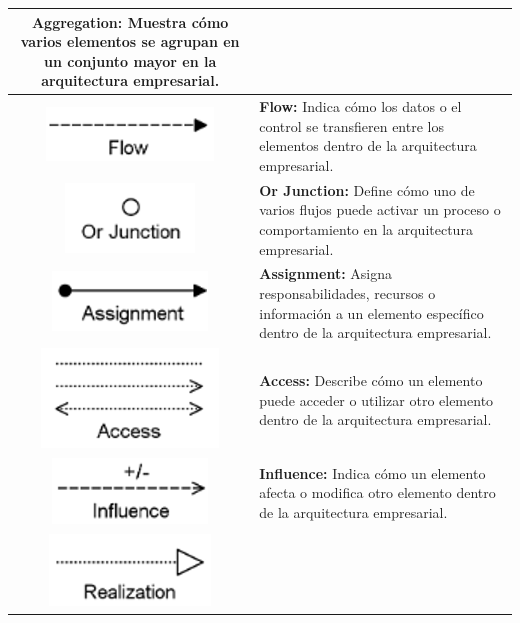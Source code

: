 \begin{longtable}{|c|p{8cm}|}
\textbf{Aggregation:} Muestra cómo varios elementos se agrupan en un conjunto mayor en la arquitectura empresarial. \\
\hline
\includegraphics{anexos/ARCHI/relations/flow.png} & 
\textbf{Flow:} Indica cómo los datos o el control se transfieren entre los elementos dentro de la arquitectura empresarial. \\
\hline
\includegraphics{anexos/ARCHI/relations/or.png} & 
\textbf{Or Junction:} Define cómo uno de varios flujos puede activar un proceso o comportamiento en la arquitectura empresarial. \\
\hline
\includegraphics{anexos/ARCHI/relations/assignment.png} & 
\textbf{Assignment:} Asigna responsabilidades, recursos o información a un elemento específico dentro de la arquitectura empresarial. \\
\hline
\includegraphics{anexos/ARCHI/relations/access.png} & 
\textbf{Access:} Describe cómo un elemento puede acceder o utilizar otro elemento dentro de la arquitectura empresarial. \\
\hline
\includegraphics{anexos/ARCHI/relations/influence.png} & 
\textbf{Influence:} Indica cómo un elemento afecta o modifica otro elemento dentro de la arquitectura empresarial. \\
\hline
\includegraphics{anexos/ARCHI/relations/realization.png} & 

\end{longtable}
